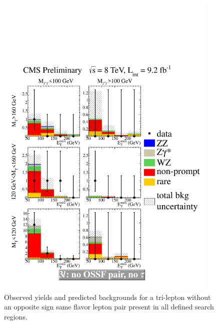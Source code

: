 \begin{figure}[htp]
\begin{center}
\includegraphics[width=0.95\textwidth]{plots/3lfinal/ossf0tau0.pdf}
\caption{Observed yields and predicted backgrounds for a tri-lepton without an opposite sign same flavor 
lepton pair present in all defined search regions.}
\label{fig:OSSF0tau0}
\end{center}
\end{figure}
